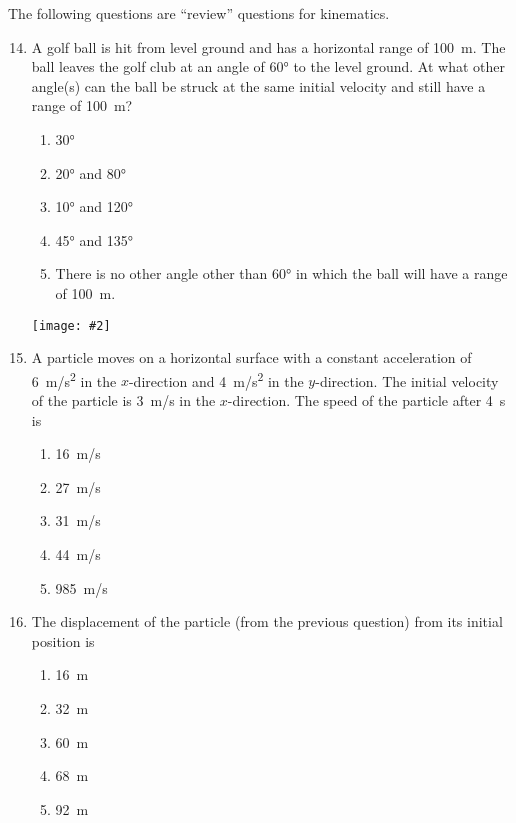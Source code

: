 \documentclass[12pt]{article}
\newcommand{\pic}[2]{\texttt{[image: \#2]}}
\begin{document}
\newpage
\noindent The following questions are ``review'' questions for kinematics.

\begin{enumerate}[leftmargin=50pt,label=\underline{\hspace{0.4in}} \arabic*.]
  \setcounter{enumi}{13}

\item  A golf ball is hit from level ground and has a horizontal range of
  \SI{100}{m}. The ball leaves the golf club at an angle of \ang{60} to the
  level ground. At what other angle(s) can the ball be struck at the same
  initial velocity and still have a range of \SI{100}{m}?
  \begin{enumerate}[noitemsep,topsep=0pt]
  \item\ang{30}
  \item\ang{20} and \ang{80}
  \item\ang{10} and \ang{120}
  \item\ang{45} and \ang{135}
  \item There is no other angle other than \ang{60} in which the ball will have
    a range of \SI{100}{m}.
  \end{enumerate}

  \vspace{-.23in}\begin{center}
    \pic{0.3}{golf.png}
  \end{center}

\item\vspace{-.2in}A particle moves on a horizontal surface with a constant acceleration of
  \SI{6}{m/s^2} in the $x$-direction and \SI{4}{m/s^2} in the $y$-direction. The
  initial velocity of the particle is \SI{3}{m/s} in the $x$-direction.
  The speed of the particle after \SI{4}{s} is
  \begin{enumerate}[noitemsep,topsep=0pt]
  \item\SI{16}{m/s}
  \item\SI{27}{m/s}
  \item\SI{31}{m/s}
  \item\SI{44}{m/s}
  \item\SI{985}{m/s}
  \end{enumerate}

\item The displacement of the particle (from the previous question) from its
  initial position is
  \begin{enumerate}[noitemsep,topsep=0pt]
  \item\SI{16}{\metre}
  \item\SI{32}{\metre}
  \item\SI{60}{\metre}
  \item\SI{68}{\metre}
  \item\SI{92}{\metre}
  \end{enumerate}


\end{enumerate}
\end{document}
